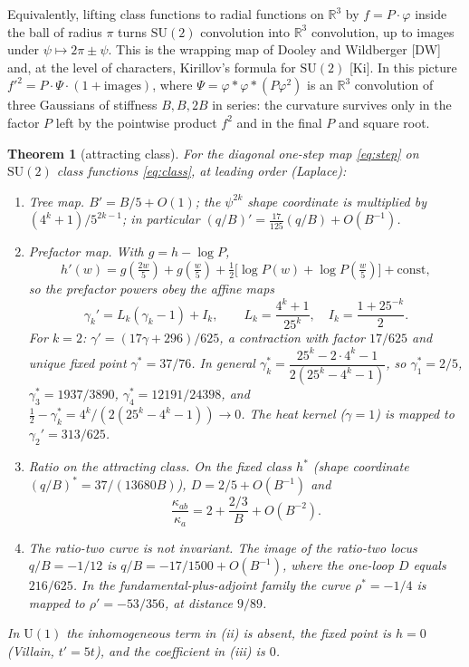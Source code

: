 \documentclass[11pt,a4paper]{article}
\newtheorem{theorem}{Theorem}
\theoremstyle{definition}
\theoremstyle{remark}
\newcommand{\R}{\mathbb{R}}
\newcommand{\SU}{\mathrm{SU}(2)}
\begin{document}
Equivalently, lifting class functions to radial functions on $\R^3$ by $f=P\cdot\varphi$ inside the ball of radius $\pi$ turns $\SU$ convolution into $\R^3$ convolution, up to images under $\psi\mapsto2\pi\pm\psi$.
This is the wrapping map of Dooley and Wildberger [DW] and, at the level of characters, Kirillov's formula for $\SU$ [Ki].
In this picture $f'^2=P\cdot\Psi\cdot(1+\text{images})$, where $\Psi=\varphi*\varphi*(P\varphi^2)$ is an $\R^3$ convolution of three Gaussians of stiffness $B,B,2B$ in series: the curvature survives only in the factor $P$ left by the pointwise product $f^2$ and in the final $P$ and square root.

\begin{theorem}[attracting class]\label{thm:class}
For the diagonal one-step map \eqref{eq:step} on $\SU$ class functions \eqref{eq:class}, at leading order (Laplace):
\begin{enumerate}[label=(\roman*)]
\item \emph{Tree map.} $B'=B/5+O(1)$; the $\psi^{2k}$ shape coordinate is multiplied by $(4^k+1)/5^{2k-1}$; in particular $(q/B)'=\tfrac{17}{125}(q/B)+O(B^{-1})$.
\item \emph{Prefactor map.} With $g=h-\log P$,
\[
h'(w)=g(\tfrac{2w}5)+g(\tfrac w5)+\tfrac12\bigl[\log P(w)+\log P(\tfrac w5)\bigr]+\mathrm{const},
\]
so the prefactor powers obey the affine maps
\[
\gamma_k'=L_k(\gamma_k-1)+I_k,\qquad L_k=\frac{4^k+1}{25^k},\quad I_k=\frac{1+25^{-k}}2 .
\]
For $k=2$: $\gamma'=(17\gamma+296)/625$, a contraction with factor $17/625$ and unique fixed point $\gamma^*=37/76$. In general $\gamma_k^*=\dfrac{25^k-2\cdot4^k-1}{2(25^k-4^k-1)}$, so $\gamma^*_1=2/5$, $\gamma^*_3=1937/3890$, $\gamma^*_4=12191/24398$, and $\tfrac12-\gamma_k^*=4^k/(2(25^k-4^k-1))\to0$. The heat kernel ($\gamma=1$) is mapped to $\gamma_2'=313/625$.
\item \emph{Ratio on the attracting class.} On the fixed class $h^*$ (shape coordinate $(q/B)^*=37/(13680B)$), $D=2/5+O(B^{-1})$ and
\[
\frac{\kappa_{ab}}{\kappa_a}=2+\frac{2/3}{B}+O(B^{-2}).
\]
\item \emph{The ratio-two curve is not invariant.} The image of the ratio-two locus $q/B=-1/12$ is $q/B=-17/1500+O(B^{-1})$, where the one-loop $D$ equals $216/625$. In the fundamental-plus-adjoint family the curve $\rho^*=-1/4$ is mapped to $\rho'=-53/356$, at distance $9/89$.
\end{enumerate}
In $\mathrm{U}(1)$ the inhomogeneous term in (ii) is absent, the fixed point is $h=0$ (Villain, $t'=5t$), and the coefficient in (iii) is $0$.
\end{theorem}
\end{document}
